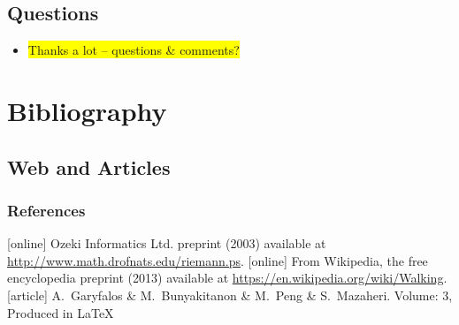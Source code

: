 \documentclass[xcolor=pdftex,dvipsnames,table]{beamer}
\begin{document}
\subsection*{Questions}
\begin{frame}
  \begin{itemize}
     \Large
    \item \colorbox{yellow}{Thanks a lot – questions \& comments?}
  \end{itemize} 
\end{frame}

\section{Bibliography}
  \subsection*{Web and Articles}

\begin{frame}[allowframebreaks]
  \frametitle<presentation>{References}
     
  \begin{thebibliography}{10}
  [online]
  Ozeki Informatics Ltd.
    \newblock preprint (2003)
    \newblock available at \url{http://www.math.drofnats.edu/riemann.ps}.
  [online]
  From Wikipedia, the free encyclopedia
    \newblock preprint (2013)
    \newblock available at \url{https://en.wikipedia.org/wiki/Walking}.
  [article]
    A.~Garyfalos \& M.~Bunyakitanon \& M.~Peng \& S.~Mazaheri.
    \newblock Volume: 3, Produced in \LaTeX
  \end{thebibliography}
\end{frame}
\end{document}
